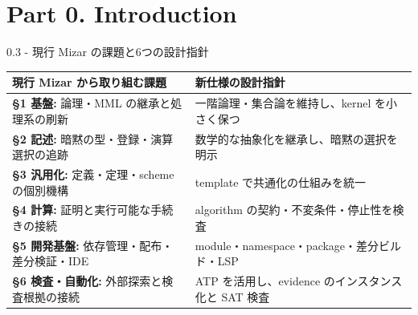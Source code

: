 \documentclass[dvipdfmx,aspectratio=169,11pt]{beamer}
\begin{document}
\section{Part 0. Introduction}
\begin{frame}[fragile,t]{0.3 - 現行 Mizar の課題と6つの設計指針}
\begin{footnotesize}
\setlength{\tabcolsep}{3pt}
\renewcommand{\arraystretch}{1.15}
\begin{tabularx}{\textwidth}{>{\raggedright\arraybackslash}X>{\raggedright\arraybackslash}X}
\toprule
\textbf{現行 Mizar から取り組む課題} & \textbf{新仕様の設計指針} \\
\midrule
\textcolor{blue!55!black}{\textbf{§1 基盤:}} 論理・MML の継承と処理系の刷新 & 一階論理・集合論を維持し、kernel を小さく保つ \\
\textcolor{blue!55!black}{\textbf{§2 記述:}} 暗黙の型・登録・演算選択の追跡 & 数学的な抽象化を継承し、暗黙の選択を明示 \\
\textcolor{blue!55!black}{\textbf{§3 汎用化:}} 定義・定理・scheme の個別機構 & template で共通化の仕組みを統一 \\
\textcolor{blue!55!black}{\textbf{§4 計算:}} 証明と実行可能な手続きの接続 & algorithm の契約・不変条件・停止性を検査 \\
\textcolor{blue!55!black}{\textbf{§5 開発基盤:}} 依存管理・配布・差分検証・IDE & module・namespace・package・差分ビルド・LSP \\
\textcolor{blue!55!black}{\textbf{§6 検査・自動化:}} 外部探索と検査根拠の接続 & ATP を活用し、evidence のインスタンス化と SAT 検査 \\
\bottomrule
\end{tabularx}
\end{footnotesize}

\end{frame}
\end{document}
